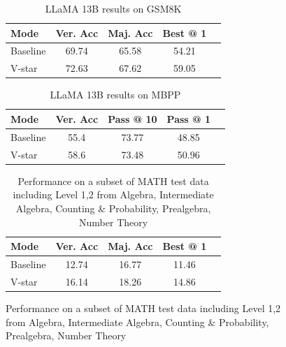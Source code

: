 \begin{figure}[ht]
\begin{table}[t]
\caption{LLaMA 13B results on GSM8K}
\label{sample-table}
\vskip 0.15in
\begin{center}
\begin{small}
\begin{sc}
\begin{tabular}{lcccr}
\toprule
Mode & Ver. Acc & Maj. Acc & Best @ 1 \\
\midrule
Baseline  & 69.74 & 65.58 & 54.21\\
V-star & 72.63 & 67.62 & 59.05 \\
\bottomrule
\end{tabular}
\end{sc}
\end{small}
\end{center}
\vskip -0.1in
\end{table}

\begin{table}[t]
\caption{LLaMA 13B results on MBPP}
\label{sample-table}
\vskip 0.15in
\begin{center}
\begin{small}
\begin{sc}
\begin{tabular}{lcccr}
\toprule
Mode & Ver. Acc & Pass @ 10 & Pass @ 1 \\
\midrule
Baseline  & 55.4 & 73.77 & 48.85\\
V-star & 58.6 & 73.48 & 50.96 \\
\bottomrule
\end{tabular}
\end{sc}
\end{small}
\end{center}
\vskip -0.1in
\end{table}

\begin{table}[t]
\caption{Performance on a subset of MATH test data including Level 1,2 from Algebra, Intermediate Algebra, Counting \& Probability, Prealgebra, 
Number Theory}
\label{sample-table}
\vskip 0.15in
\begin{center}
\begin{small}
\begin{sc}
\begin{tabular}{lcccr}
\toprule
Mode & Ver. Acc & Maj. Acc & Best @ 1 \\
\midrule
Baseline  & 12.74 & 16.77 & 11.46\\
V-star & 16.14 & 18.26 & 14.86 \\
\bottomrule
\end{tabular}
\end{sc}
\end{small}
\end{center}
\vskip -0.1in
\end{table}


\end{figure}
